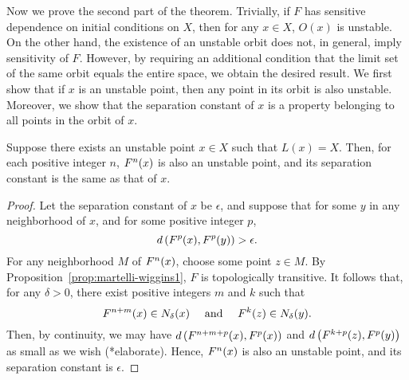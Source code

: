 \documentclass[10pt,draft,twoside]{book}
\begin{document}
Now we prove the second part of the theorem.
Trivially, if $F$ has sensitive dependence on initial conditions on $X$, then for any $x \in X$, $O(x)$ is unstable.
On the other hand, the existence of an unstable orbit does not, in general, imply sensitivity of $F$.
However, by requiring an additional condition that the limit set of the same orbit equals the entire space, we obtain the desired result.
We first show that if $x$ is an unstable point, then any point in its orbit is also unstable.
Moreover, we show that the separation constant of $x$ is a property belonging to all points in the orbit of $x$.
\begin{proposition}
  Suppose there exists an unstable point $x \in X$ such that $L(x) = X$.
  Then, for each positive integer $n$, $F^{n}(x)$ is also an unstable point, and its separation constant is the same as that of $x$.
  \label{prop:unstable-orbit}
  \begin{proof}
    Let the separation constant of $x$ be $\epsilon$, and suppose that for some $y$ in any neighborhood of $x$, and for some positive integer $p$,
    \begin{equation*}
      d\left( F^{p}(x), F^{p}(y) \right) > \epsilon.
    \end{equation*}
    For any neighborhood $M$ of $F^{n}(x)$, choose some point $z \in M$.
    By Proposition~\ref{prop:martelli-wiggins1}, $F$ is topologically transitive.
    It follows that, for any $\delta > 0$, there exist positive integers $m$ and $k$ such that
    \begin{equation*}
      F^{n+m}(x) \in N_{\delta}(x)
      \quad \mbox{ and } \quad
      F^{k}(z) \in N_{\delta}(y).
    \end{equation*}
    Then, by continuity, we may have $d\left( F^{n+m+p}(x), F^{p}(x) \right)$ and $d\left( F^{k+p}(z), F^{p}(y) \right)$ as small as we wish (*elaborate).
    Hence, $F^{n}(x)$ is also an unstable point, and its separation constant is $\epsilon$.
  \end{proof}
\end{proposition}
\end{document}
